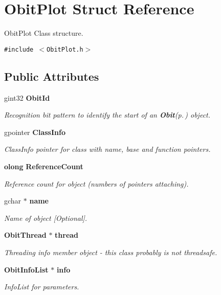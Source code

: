 \section{Obit\-Plot Struct Reference}
\label{structObitPlot}
Obit\-Plot Class structure.  


{\tt \#include $<$Obit\-Plot.h$>$}

\subsection*{Public Attributes}
\begin{CompactItemize}
\item 
gint32 {\bf Obit\-Id}
\begin{CompactList}\small\item\em Recognition bit pattern to identify the start of an {\bf Obit}{\rm (p.\,\pageref{structObit})} object. \item\end{CompactList}\item 
gpointer {\bf Class\-Info}
\begin{CompactList}\small\item\em Class\-Info pointer for class with name, base and function pointers. \item\end{CompactList}\item 
{\bf olong} {\bf Reference\-Count}
\begin{CompactList}\small\item\em Reference count for object (numbers of pointers attaching). \item\end{CompactList}\item 
gchar $\ast$ {\bf name}
\begin{CompactList}\small\item\em Name of object [Optional]. \item\end{CompactList}\item 
{\bf Obit\-Thread} $\ast$ {\bf thread}
\begin{CompactList}\small\item\em Threading info member object - this class probably is not threadsafe. \item\end{CompactList}\item 
{\bf Obit\-Info\-List} $\ast$ {\bf info}
\begin{CompactList}\small\item\em Info\-List for parameters. \item\end{CompactList}\item 

\end{CompactItemize}
